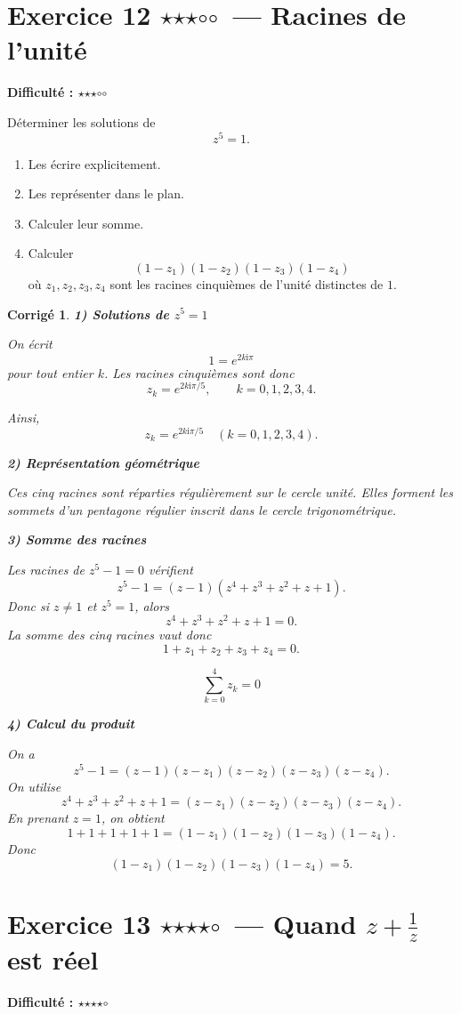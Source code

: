 \documentclass[11pt,a4paper]{article}
\newtheorem*{corrige}{Corrigé}
\newcommand{\ii}{\mathrm{i}}
\newcommand{\fullstar}{\(\star\)}
\newcommand{\emptystar}{\(\circ\)}
\newcommand{\threeStars}{\fullstar\fullstar\fullstar\emptystar\emptystar}
\newcommand{\fourStars}{\fullstar\fullstar\fullstar\fullstar\emptystar}
\newcommand{\difficulty}[1]{\textbf{Difficulté : #1}}
\begin{document}
\section{Exercice 12 \threeStars\ --- Racines de l'unité}
\difficulty{\threeStars}

Déterminer les solutions de
\[
z^5=1.
\]

\begin{enumerate}
    \item Les écrire explicitement.
    \item Les représenter dans le plan.
    \item Calculer leur somme.
    \item Calculer
    \[
    (1-z_1)(1-z_2)(1-z_3)(1-z_4)
    \]
    où \(z_1,z_2,z_3,z_4\) sont les racines cinquièmes de l'unité distinctes de \(1\).
\end{enumerate}

\begin{corrige}
\textbf{1) Solutions de \(z^5=1\)}

On écrit
\[
1=e^{2k\ii\pi}
\]
pour tout entier \(k\). Les racines cinquièmes sont donc
\[
z_k=e^{2k\ii\pi/5},\qquad k=0,1,2,3,4.
\]

Ainsi,
\[
\boxed{z_k=e^{2k\ii\pi/5}\quad (k=0,1,2,3,4)}.
\]

\textbf{2) Représentation géométrique}

Ces cinq racines sont réparties régulièrement sur le cercle unité. Elles forment les sommets d'un pentagone régulier inscrit dans le cercle trigonométrique.

\textbf{3) Somme des racines}

Les racines de \(z^5-1=0\) vérifient
\[
z^5-1=(z-1)(z^4+z^3+z^2+z+1).
\]
Donc si \(z\neq 1\) et \(z^5=1\), alors
\[
z^4+z^3+z^2+z+1=0.
\]
La somme des cinq racines vaut donc
\[
1+z_1+z_2+z_3+z_4=0.
\]

\[
\boxed{\sum_{k=0}^4 z_k=0}
\]

\textbf{4) Calcul du produit}

On a
\[
z^5-1=(z-1)(z-z_1)(z-z_2)(z-z_3)(z-z_4).
\]
On utilise
\[
z^4+z^3+z^2+z+1=(z-z_1)(z-z_2)(z-z_3)(z-z_4).
\]
En prenant \(z=1\), on obtient
\[
1+1+1+1+1=(1-z_1)(1-z_2)(1-z_3)(1-z_4).
\]
Donc
\[
\boxed{(1-z_1)(1-z_2)(1-z_3)(1-z_4)=5}.
\]
\end{corrige}

\section{Exercice 13 \fourStars\ --- Quand \(z+\frac1z\) est réel}
\difficulty{\fourStars}
\end{document}
